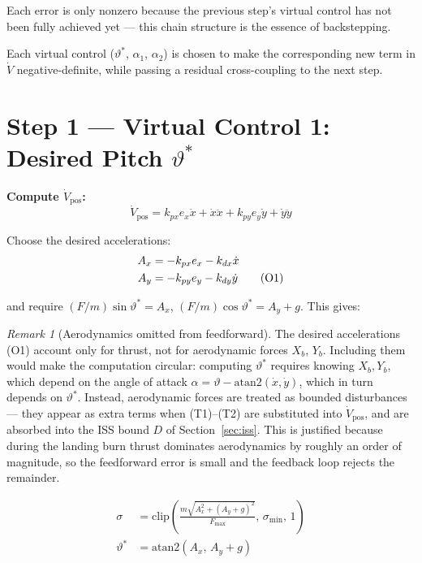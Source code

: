 \documentclass[11pt,a4paper]{article}
\theoremstyle{plain}
\theoremstyle{remark}
\newtheorem{remark}{Remark}[section]
\newcommand{\vth}{\vartheta}
\newcommand{\vths}{\vartheta^*}
\newcommand{\clip}{\mathrm{clip}}
\newcommand{\Fmax}{F_{\max}}
\begin{document}
Each error is only nonzero because the previous step's virtual control has not been fully achieved yet --- this chain structure is the essence of backstepping.

Each virtual control ($\vths$, $\alpha_1$, $\alpha_2$) is chosen to make the corresponding new term in $\dot V$ negative-definite, while passing a residual cross-coupling to the next step.

\section{Step 1 --- Virtual Control 1: Desired Pitch \texorpdfstring{$\vartheta^*$}{theta*}}

\textbf{Compute $\dot V_{\mathrm{pos}}$:}
\[
  \dot V_{\mathrm{pos}} = k_{px}e_x\dot x + \dot x\ddot x + k_{py}e_y\dot y + \dot y\ddot y
\]

Choose the desired accelerations:
\begin{align}
  A_x &= -k_{px}e_x - k_{dx}\dot x \notag \\
  A_y &= -k_{py}e_y - k_{dy}\dot y \tag{O1}
\end{align}

and require $(F/m)\sin\vths = A_x$, $(F/m)\cos\vths = A_y + g$. This gives:

\begin{remark}[Aerodynamics omitted from feedforward]
The desired accelerations (O1) account only for thrust, not for aerodynamic forces $X_b$, $Y_b$. Including them would make the computation circular: computing $\vths$ requires knowing $X_b, Y_b$, which depend on the angle of attack $\alpha = \vth - \mathrm{atan2}(\dot x, \dot y)$, which in turn depends on $\vths$. Instead, aerodynamic forces are treated as bounded disturbances --- they appear as extra terms when (T1)--(T2) are substituted into $\dot V_\mathrm{pos}$, and are absorbed into the ISS bound $D$ of Section~\ref{sec:iss}. This is justified because during the landing burn thrust dominates aerodynamics by roughly an order of magnitude, so the feedforward error is small and the feedback loop rejects the remainder.
\end{remark}

\begin{align}
  \sigma &= \clip\!\left(\frac{m\sqrt{A_x^2 + (A_y+g)^2}}{\Fmax},\, \sigma_{\min},\, 1\right) \tag{O2} \\[4pt]
  \vths &= \mathrm{atan2}(A_x,\, A_y + g) \tag{O3}
\end{align}
\end{document}
